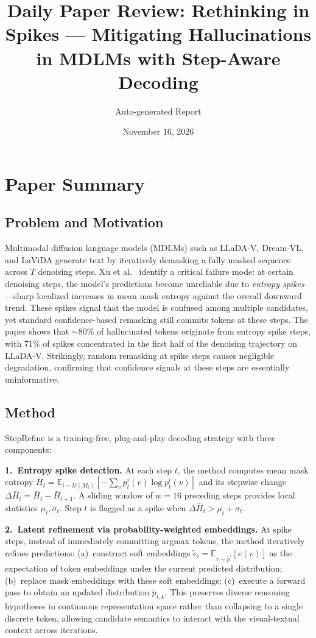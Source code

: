 \documentclass[11pt,a4paper]{article}
\title{Daily Paper Review: Rethinking in Spikes --- Mitigating Hallucinations\\in MDLMs with Step-Aware Decoding}
\author{Auto-generated Report}
\date{November 16, 2026}
\begin{document}
\maketitle

\section{Paper Summary}

\subsection{Problem and Motivation}
Multimodal diffusion language models (MDLMs) such as LLaDA-V, Dream-VL, and LaViDA generate text by iteratively demasking a fully masked sequence across $T$ denoising steps. Xu et al.~\cite{xu2026spikes} identify a critical failure mode: at certain denoising steps, the model's predictions become unreliable due to \emph{entropy spikes}---sharp localized increases in mean mask entropy against the overall downward trend. These spikes signal that the model is confused among multiple candidates, yet standard confidence-based remasking still commits tokens at these steps. The paper shows that $\sim$80\% of hallucinated tokens originate from entropy spike steps, with 71\% of spikes concentrated in the first half of the denoising trajectory on LLaDA-V. Strikingly, random remasking at spike steps causes negligible degradation, confirming that confidence signals at these steps are essentially uninformative.

\subsection{Method}
StepRefine is a training-free, plug-and-play decoding strategy with three components:

\textbf{1.~Entropy spike detection.} At each step $t$, the method computes mean mask entropy $\bar{H}_t = \mathbb{E}_{i \sim \mathcal{U}(M_t)}[-\sum_{v} p_t^i(v) \log p_t^i(v)]$ and its stepwise change $\Delta \bar{H}_t = \bar{H}_t - \bar{H}_{t+1}$. A sliding window of $w{=}16$ preceding steps provides local statistics $\mu_t, \sigma_t$. Step $t$ is flagged as a spike when $\Delta \bar{H}_t > \mu_t + \sigma_t$.

\textbf{2.~Latent refinement via probability-weighted embeddings.} At spike steps, instead of immediately committing argmax tokens, the method iteratively refines predictions: (a)~construct soft embeddings $\tilde{e}_i = \mathbb{E}_{v \sim \tilde{p}^i}[e(v)]$ as the expectation of token embeddings under the current predicted distribution; (b)~replace mask embeddings with these soft embeddings; (c)~execute a forward pass to obtain an updated distribution $\tilde{p}_{t,k}$. This preserves diverse reasoning hypotheses in continuous representation space rather than collapsing to a single discrete token, allowing candidate semantics to interact with the visual-textual context across iterations.
\end{document}
